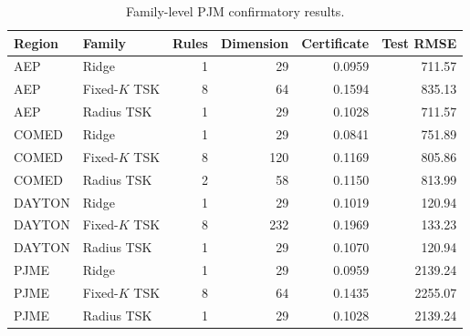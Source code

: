 \begin{table}[t]
\centering
\caption{Family-level PJM confirmatory results.}
\label{tab:pjm_confirmatory_families}
\begin{tabular}{llrrrr}
\hline
Region & Family & Rules & Dimension & Certificate & Test RMSE \\
\hline
AEP & Ridge & 1 & 29 & 0.0959 & 711.57 \\
AEP & Fixed-$K$ TSK & 8 & 64 & 0.1594 & 835.13 \\
AEP & Radius TSK & 1 & 29 & 0.1028 & 711.57 \\
COMED & Ridge & 1 & 29 & 0.0841 & 751.89 \\
COMED & Fixed-$K$ TSK & 8 & 120 & 0.1169 & 805.86 \\
COMED & Radius TSK & 2 & 58 & 0.1150 & 813.99 \\
DAYTON & Ridge & 1 & 29 & 0.1019 & 120.94 \\
DAYTON & Fixed-$K$ TSK & 8 & 232 & 0.1969 & 133.23 \\
DAYTON & Radius TSK & 1 & 29 & 0.1070 & 120.94 \\
PJME & Ridge & 1 & 29 & 0.0959 & 2139.24 \\
PJME & Fixed-$K$ TSK & 8 & 64 & 0.1435 & 2255.07 \\
PJME & Radius TSK & 1 & 29 & 0.1028 & 2139.24 \\
\hline
\end{tabular}
\end{table}
